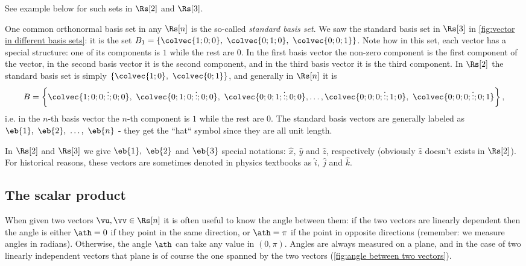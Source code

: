 See example below for such sets in $\Rs[2]$ and $\Rs[3]$.

One common orthonormal basis set in any $\Rs[n]$ is the so-called \emph{standard basis set}. We saw the standard basis set in $\Rs[3]$ in \autoref{fig:vector in different basis sets}: it is the set $B_{1}=\left\{ \colvec{1;0;0},\ \colvec{0;1;0},\ \colvec{0;0;1} \right\}$. Note how in this set, each vector has a special structure: one of its components is $1$ while the rest are $0$. In the first basis vector the non-zero component is the first component of the vector, in the second basis vector it is the second component, and in the third basis vector it is the third component. In $\Rs[2]$ the standard basis set is simply $\left\{ \colvec{1;0},\ \colvec{0;1} \right\}$, and generally in $\Rs[n]$ it is
\begin{equation}
	B = \left\{ \colvec{1;0;0;\vdots;0;0},\ \colvec{0;1;0;\vdots;0;0},\ \colvec{0;0;1;\vdots;0;0}, \dots, \colvec{0;0;0;\vdots;1;0},\ \colvec{0;0;0;\vdots;0;1} \right\},
	\label{eq:std basis set}
\end{equation}
i.e. in the $n$-th basis vector the $n$-th component is $1$ while the rest are $0$. The standard basis vectors are generally labeled as $\eb{1},\ \eb{2},\ \dots,\ \eb{n}$ - they get the ``hat`` symbol since they are all unit length.

In $\Rs[2]$ and $\Rs[3]$ we give $\eb{1},\ \eb{2}$ and $\eb{3}$ special notations: $\hat{x},\ \hat{y}$ and $\hat{z}$, respectively (obviously $\hat{z}$ doesn't exists in $\Rs[2]$). For historical reasons, these vectors are sometimes denoted in physics textbooks as $\hat{i},\ \hat{j}$ and $\hat{k}$.

\subsection{The scalar product}
When given two vectors $\vu,\vv\in\Rs[n]$ it is often useful to know the angle between them: if the two vectors are linearly dependent then the angle is either $\ath=0$ if they point in the same direction, or $\ath=\pi$ if the point in opposite directions (remember: we measure angles in radians). Otherwise, the angle $\ath$ can take any value in $(0,\pi)$. Angles are always measured on a plane, and in the case of two linearly independent vectors that plane is of course the one spanned by the two vectors (\autoref{fig:angle between two vectors}).


